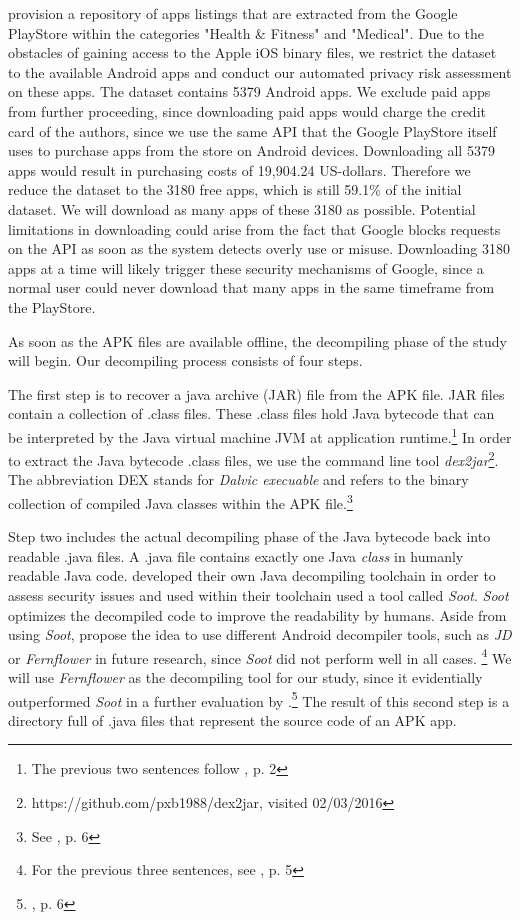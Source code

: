 \documentclass[
	a4paper,
	oneside,
	12pt,
	liststotocnumbered
]{article}
\let\cite\textcite
\begin{document}
\cite{Xu2015} provision a repository of apps listings that are extracted from the Google PlayStore within the categories "Health \& Fitness" and "Medical".
Due to the obstacles of gaining access to the Apple iOS binary files, we restrict the dataset to the available Android apps and conduct our automated privacy risk assessment on these apps.
The \cite{Xu2015} dataset contains 5379 Android apps. 
We exclude paid apps from further proceeding, since downloading paid apps would charge the credit card of the authors, since we use the same \acs{API} that the Google PlayStore itself uses to purchase apps from the store on Android devices. 
Downloading all 5379 apps would result in purchasing costs of 19,904.24 US-dollars. 
Therefore we reduce the dataset to the 3180 free apps, which is still 59.1\% of the  initial dataset. 
We will download as many apps of these 3180 as possible.
Potential limitations in downloading could arise from the fact that Google blocks requests on the API as soon as the system detects overly use or misuse. Downloading 3180 apps at a time will likely trigger these security mechanisms of Google, since a normal user could never download that many apps in the same timeframe from the PlayStore.

As soon as the \acs{APK} files are available offline, the decompiling phase of the study will begin.
Our decompiling process consists of four steps.

The first step is to recover a java archive (\acs{JAR}) file from the \acs{APK} file.
\acs{JAR} files contain a collection of .class files. 
These .class files hold Java bytecode that can be interpreted by the Java virtual machine \acs{JVM} at application runtime.\footnote{The previous two sentences follow \cite{Enck2011}, p. 2} 
In order to extract the Java bytecode .class files, we use the command line tool \textit{dex2jar}\footnote{https://github.com/pxb1988/dex2jar, visited 02/03/2016}. 
The abbreviation \acs{DEX} stands for \textit{Dalvic execuable} and refers to the binary collection of compiled Java classes within the \acs{APK} file.\footnote{See \cite{xu2013techniques}, p. 6}

Step two includes the actual decompiling phase of the Java bytecode back into readable .java files. 
A .java file contains exactly one Java \textit{class} in humanly readable Java code. 
\cite{Enck2011} developed their own Java decompiling toolchain in order to assess security issues and used within their toolchain used a tool called \textit{Soot}.
\textit{Soot} optimizes the decompiled code to improve the readability by humans.
Aside from using \textit{Soot}, \cite{Enck2011} propose the idea to use different Android decompiler tools, such as \textit{JD} or \textit{Fernflower} in future research, since \textit{Soot} did not perform well in all cases.  \footnote{For the previous three sentences, see \cite{Enck2011}, p. 5}
We will use \textit{Fernflower} as the decompiling tool for our study, since it evidentially outperformed \textit{Soot} in a further evaluation by \cite{Enck2011}.\footnote{\cite{Enck2011}, p. 6}
The result of this second step is a directory full of .java files that represent the source code of an \acs{APK} app.
\end{document}
